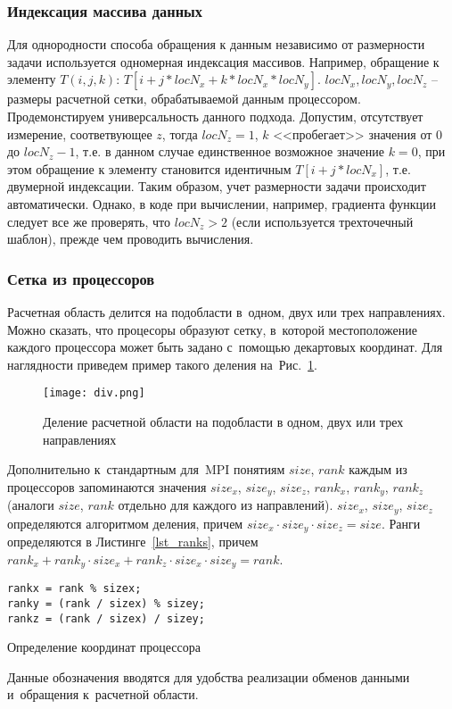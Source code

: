 \subsubsection{Индексация массива данных}
Для однородности способа обращения к данным независимо
от размерности задачи используется одномерная индексация массивов.
Например, обращение к элементу $T(i,j,k)$:
$T[i + j * locN_x + k * locN_x * locN_y]$.
$locN_x, locN_y, locN_z$ -- размеры расчетной сетки, обрабатываемой
данным процессором. Продемонстируем универсальность данного
подхода. Допустим, отсутствует измерение, соответвующее $z$, тогда
$locN_z=1$, $k$ <<пробегает>> значения от $0$ до $locN_z-1$, т.е.
в данном случае единственное возможное значение $k=0$, при этом
обращение к элементу становится идентичным $T[i + j * locN_x]$, т.е.
двумерной индексации. Таким образом, учет размерности задачи
происходит автоматически. Однако, в коде при вычислении,
например, градиента функции следует все же проверять, что $locN_z > 2$
(если используется трехточечный шаблон),
прежде чем проводить вычисления.

\subsubsection{Сетка из процессоров}
Расчетная область делится на подобласти в~одном, двух или трех направлениях.
Можно сказать, что процесоры образуют сетку, в~которой
местоположение каждого процессора может быть задано с~помощью
декартовых координат.
Для наглядности приведем пример такого деления на~Рис.~\ref{pic_div}.
\begin{figure}[!h]\center
\texttt{[image: div.png]} 
\caption{Деление расчетной области на подобласти в одном, двух или трех направлениях}
\label{pic_div}
\end{figure}
Дополнительно к~стандартным для~MPI понятиям $size$, $rank$
каждым из процессоров запоминаются значения $size_x$, $size_y$, $size_z$,
$rank_x$, $rank_y$, $rank_z$ (аналоги $size$, $rank$ отдельно для каждого из направлений).
$size_x$, $size_y$, $size_z$ определяются алгоритмом деления,
причем $size_x \cdot size_y \cdot size_z = size$.
Ранги определяются в Листинге~\ref{lst_ranks}, причем
$rank_x + rank_y \cdot size_x + rank_z \cdot size_x \cdot size_y = rank$.
\begin{listing}[!h]
\begin{verbatim}
rankx = rank % sizex;
ranky = (rank / sizex) % sizey;
rankz = (rank / sizex) / sizey;
\end{verbatim}
\caption{Определение координат процессора}
\label{lst_ranks}
\end{listing}
Данные обозначения вводятся для удобства реализации обменов
данными и~обращения к~расчетной области.

